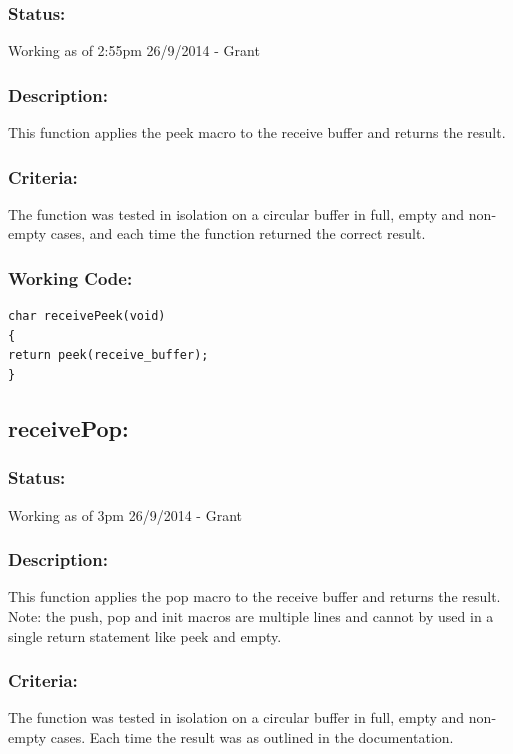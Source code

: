 \documentclass[]{report}
\begin{document}
\subsubsection{Status:}
Working as of 2:55pm 26/9/2014 - Grant

\subsubsection{Description:}
This function applies the peek macro to the receive buffer and returns the result.

\subsubsection{Criteria:}
The function was tested in isolation on a circular buffer in full, empty and non-empty cases, and each time the function returned the correct result.

\subsubsection{Working Code:}
\begin{lstlisting}
char receivePeek(void)
{
return peek(receive_buffer);
}
\end{lstlisting}

\subsection{receivePop:}
\subsubsection{Status:}
Working as of 3pm 26/9/2014 - Grant

\subsubsection{Description:}
This function applies the pop macro to the receive buffer and returns the result. Note: the push, pop and init macros are multiple lines and cannot by used in a single return statement like peek and empty.

\subsubsection{Criteria:}
The function was tested in isolation on a circular buffer in full, empty and non-empty cases. Each time the result was as outlined in the documentation.
\end{document}
